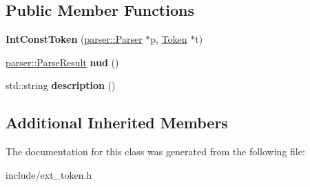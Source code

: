 \subsection*{Public Member Functions}
\begin{DoxyCompactItemize}
\item 
{\bfseries Int\+Const\+Token} (\hyperlink{classfcal_1_1parser_1_1Parser}{parser\+::\+Parser} $\ast$p, \hyperlink{classfcal_1_1scanner_1_1Token}{Token} $\ast$t)\hypertarget{classfcal_1_1scanner_1_1IntConstToken_a2846b99b9b48717e35d81446618eb924}{}\label{classfcal_1_1scanner_1_1IntConstToken_a2846b99b9b48717e35d81446618eb924}

\item 
\hyperlink{classfcal_1_1parser_1_1ParseResult}{parser\+::\+Parse\+Result} {\bfseries nud} ()\hypertarget{classfcal_1_1scanner_1_1IntConstToken_aede9ed23780dbb33a7852b3ecf6183da}{}\label{classfcal_1_1scanner_1_1IntConstToken_aede9ed23780dbb33a7852b3ecf6183da}

\item 
std\+::string {\bfseries description} ()\hypertarget{classfcal_1_1scanner_1_1IntConstToken_a9359c997cac9cf57a5c7debc6a1811ab}{}\label{classfcal_1_1scanner_1_1IntConstToken_a9359c997cac9cf57a5c7debc6a1811ab}

\end{DoxyCompactItemize}
\subsection*{Additional Inherited Members}


The documentation for this class was generated from the following file\+:\begin{DoxyCompactItemize}
\item 
include/ext\+\_\+token.\+h\end{DoxyCompactItemize}
